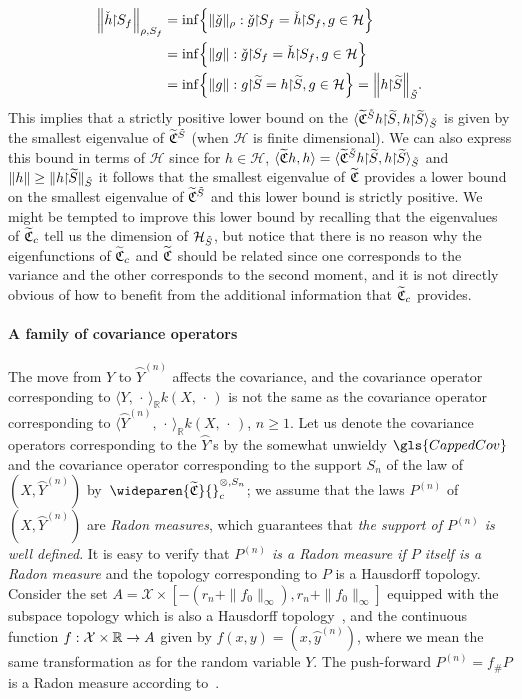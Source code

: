 \documentclass[10pt]{amsart}
\theoremstyle{definition}\newtheorem{defi}[theo]{Definition}\newtheorem{rema}[theo]{Remark}\newtheorem{exam}[theo]{Example}\newtheorem{exem}[theo]{Example}\newtheorem{nota}[theo]{Notation}
\theoremstyle{remark}
\newcommand{\restrr}
{\!\!\upharpoonright\!\!}
\newcommand{\R}{\mathbb{R}}
\newcommand{\X}{\mathcal{X}}
\newcommand{\cH}{\mathcal{H}}
\newcommand{\fkC}{\mathfrak{C}}
\newcommand{\Cov}{\tilde{\fkC}}
\newcommand{\CovCapn}{\wideparen{\widetilde{\fkC}}{\vphantom{\fkC}}^{\otimes,S_n}_c}
\let\oldtilde\tilde
\renewcommand*{\tilde}[1]{\mathchoice{\widetilde{#1}}{\widetilde{#1}}{\oldtilde{#1}}{\oldtilde{#1}}}
\renewcommand*{\to}{\mathchoice{\longrightarrow}{\rightarrow}{\rightarrow}{\rightarrow}}
\let\originalleft\left
\let\originalright\right
\renewcommand{\left}{\mathopen{}\mathclose\bgroup\originalleft}
\renewcommand{\right}{\aftergroup\egroup\originalright}
\begin{document}
\begin{equation}\label{eq:check_h_S}
\begin{aligned}[t]
\left\| \check h \restrr S_f \right\|_{\rho,S_f}
&= \inf\left\{ \|\check g \|_{\rho} : \check g \restrr S_f = \check h \restrr S_f, g \in \cH \right\}\\
&= \inf\left\{ \|g \| : \check g \restrr S_f = \check h \restrr S_f, g \in \cH \right\} \\
&= \inf\left\{ \|g \| : g \restrr \tilde S = h \restrr \tilde S, g \in \cH \right\} = \left\| h \restrr \tilde S\right\|_{\tilde S}.
\end{aligned}
\end{equation}
This implies that a strictly positive lower bound on the $\langle \Cov^{\tilde S} h \restrr \tilde S, h \restrr \tilde S \rangle_{\tilde S}$ is given by the smallest eigenvalue of $\Cov^{\tilde S}$ (when $\cH$ is finite dimensional). We can also express this bound in terms of $\cH$ since for $h \in \cH$, $\langle \Cov h, h \rangle = \langle \Cov^{\tilde S} h \restrr \tilde S, h \restrr \tilde S \rangle_{\tilde S}$ and $\|h\| \geq \|h \restrr \tilde S \|_{\tilde S}$ it follows that the smallest eigenvalue of $\Cov$ provides a lower bound on the smallest eigenvalue of $\Cov^{\tilde S}$ and this lower bound is strictly positive. We might be tempted to improve this lower bound by recalling that the eigenvalues of $\Cov_c$ tell us the dimension of $\cH_{\tilde S}$, but notice that there is no reason why the eigenfunctions of $\Cov_c$ and $\Cov$ should be related since one corresponds to the variance and the other corresponds to the second moment, and it is not directly obvious of how to benefit from the additional information that $\Cov_c$ provides.

\paragraph{A family of covariance operators}
The move from $Y$ to $\wideparen{Y}^{(n)}$ affects the covariance, and the covariance operator corresponding to $\langle Y, \,\cdot\, \rangle_\R k(X,\,\cdot\,)$ is not the same as the covariance operator corresponding to $\langle \wideparen{Y}^{(n)}, \,\cdot\, \rangle_\R k(X,\,\cdot\,)$, $n\geq 1$. Let us denote the covariance operators corresponding to the $\wideparen{Y}$'s by the somewhat unwieldy $\gls{CappedCov}$ and the covariance operator corresponding to the support $S_n$ of the law of $(X,\wideparen{Y}^{(n)})$ by~$\CovCapn$; we assume that the laws $P^{(n)}$ of $(X,\wideparen{Y}^{(n)})$ are \emph{Radon measures}, which guarantees that \emph{the support of $P^{(n)}$ is well defined}. It is easy to verify that \emph{ $P^{(n)}$ is a Radon measure if $P$ itself is a Radon measure} and the topology corresponding to $P$ is a Hausdorff topology. Consider the set $A = \X \times [- (r_n + \|f_0\|_\infty), r_n + \|f_0\|_\infty]$ equipped with the subspace topology which is also a Hausdorff topology~\cite[Theorem~2.1.6]{ENG89}, and the continuous function $f: \X \times \R \to A$ given by $f(x,y) = (x, \wideparen{y}^{(n)})$, where we mean the same transformation as for the random variable $Y$. The push-forward $P^{(n)} = f_\# P$ is a Radon measure according to~\cite[418I]{FREM}.
\end{document}
